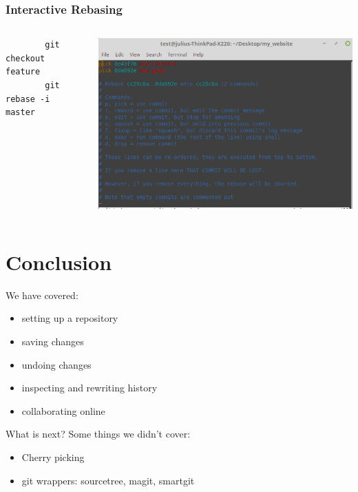 \documentclass[12pt]{beamer}
\begin{document}
\begin{frame}[fragile]
\frametitle{Interactive Rebasing}
\begin{columns}
	\begin{column}{0.5\linewidth}
		\begin{verbatim}
		git checkout feature
		git rebase -i master
		\end{verbatim}		
	\end{column}
	\begin{column}{0.5\linewidth}
		\includegraphics[width=1\linewidth]{rebase_i}
	\end{column}
\end{columns}
\end{frame}

\section{Conclusion}
\begin{frame}
We have covered:
\begin{itemize}
	\item setting up a repository
	\item saving changes
	\item undoing changes
	\item inspecting and rewriting history
	\item collaborating online
\end{itemize}
\end{frame}

\begin{frame}{What is next?}
Some things we didn't cover:
\begin{itemize}
\item Cherry picking
\item git wrappers: sourcetree, magit, smartgit
\end{itemize}
\end{frame}
\end{document}

